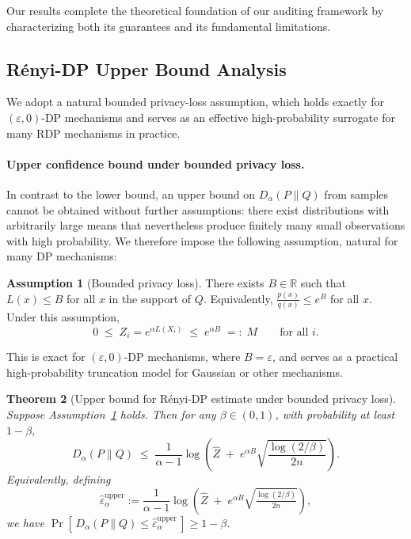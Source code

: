 \documentclass{article}
\theoremstyle{plain}
\newtheorem{theorem}{Theorem}[section]
\theoremstyle{definition}
\newtheorem{assumption}[theorem]{Assumption}
\theoremstyle{remark}
\begin{document}
Our results complete the theoretical foundation of our auditing framework by characterizing both its guarantees
and its fundamental limitations.

\subsection{R\'enyi-DP Upper Bound Analysis}
\label{sec:rdp-analysis-ub}

We adopt a natural bounded
privacy-loss assumption, which holds exactly for $(\varepsilon,0)$-DP
mechanisms and serves as an effective high-probability surrogate
for many RDP mechanisms in practice.

\paragraph{Upper confidence bound under bounded privacy loss.}
In contrast to the lower bound, an upper bound on
$D_\alpha(P\|Q)$ from samples cannot be obtained without further
assumptions: there exist distributions with arbitrarily large means
that nevertheless produce finitely many small observations with high
probability.  We therefore impose the following assumption,
natural for many DP mechanisms:

\begin{assumption}[Bounded privacy loss]
\label{assump:bounded-L}
There exists $B \in \mathbb{R}$ such that 
$L(x) \le B$ for all $x$ in the support of $Q$.
Equivalently,
$\frac{p(x)}{q(x)} \le e^B$ for all $x$.
Under this assumption,
\[
0 \;\le\; Z_i = e^{\alpha L(X_i)} \;\le\; e^{\alpha B} \;=:\; M
\qquad\text{for all $i$.}
\]
\end{assumption}

This is exact for $(\varepsilon,0)$-DP mechanisms, where $B=\varepsilon$,
and serves as a practical high-probability truncation model for
Gaussian or other mechanisms.

\begin{theorem}[Upper bound for R\'enyi-DP estimate under bounded privacy loss]
\label{thm:upper}
Suppose Assumption~\ref{assump:bounded-L} holds.  Then for any
$\beta \in (0,1)$, with probability at least $1-\beta$,
\[
D_\alpha(P\|Q)
\;\le\;
\frac{1}{\alpha - 1}
\log\left(
\widehat{Z}
\;+\;
e^{\alpha B}
\sqrt{\frac{\log(2/\beta)}{2n}}
\right).
\]
Equivalently, defining
\[
\widehat{\varepsilon}_{\alpha}^{\mathrm{upper}}
:=
\frac{1}{\alpha - 1}
\log\left(
\widehat{Z}
\;+\;
e^{\alpha B}
\sqrt{\tfrac{\log(2/\beta)}{2n}}
\right),
\]
we have
$\Pr\!\left[\,D_\alpha(P\|Q)
\le \widehat{\varepsilon}_{\alpha}^{\mathrm{upper}}\,\right]
\ge 1-\beta$.
\end{theorem}
\end{document}
